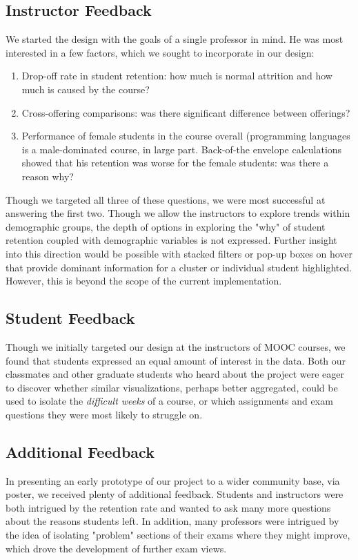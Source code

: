 
\subsection{Instructor Feedback}
We started the design with the goals of a single professor in mind. He was most interested in a few factors, which we sought to incorporate in our design:
\begin{enumerate}
\item{} Drop-off rate in student retention: how much is normal attrition and how much is caused by the course?
\item{} Cross-offering comparisons: was there significant difference between offerings?
\item{} Performance of female students in the course overall (programming languages is a male-dominated course, in large part. Back-of-the envelope calculations showed that his retention was worse for the female students: was there a reason why?
\end{enumerate}
Though we targeted all three of these questions, we were most successful at answering the first two. Though we allow the instructors to explore trends within demographic groups, the depth of options in exploring the "why" of student retention coupled with demographic variables is not expressed. Further insight into this direction would be possible with stacked filters or pop-up boxes on hover that provide dominant information for a cluster or individual student highlighted. However, this is beyond the scope of the current implementation. 

\subsection{Student Feedback}
Though we initially targeted our design at the instructors of MOOC courses, we found that students 
expressed an equal amount of interest in the data. Both our classmates and other graduate students
who heard about the project were eager to discover whether similar visualizations, perhaps better 
aggregated, could be used to isolate the \emph{difficult weeks} of a course, or which assignments and 
exam questions they were most likely to struggle on. 

\subsection{Additional Feedback}
In presenting an early prototype of our project to a wider community base, via poster, we received plenty of additional feedback. Students and instructors were both intrigued by the retention rate and wanted to ask many more questions about the reasons students left. In addition, many professors were intrigued by the idea of isolating "problem" sections of their exams where they might improve, which drove the development of further exam views. 

